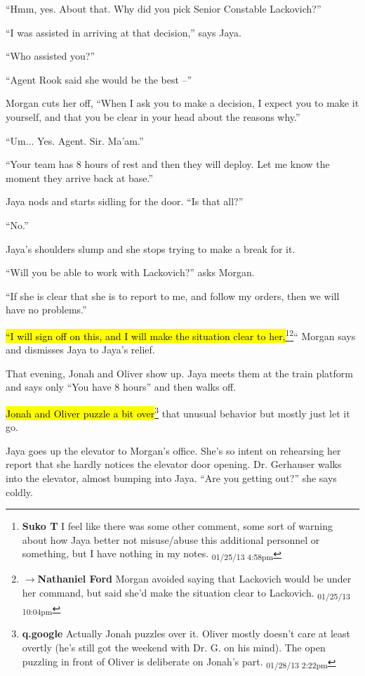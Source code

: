 ``Hmm, yes.  About that.  Why did you pick Senior Constable Lackovich?''

``I was assisted in arriving at that decision,'' says Jaya.

``Who assisted you?''

``Agent Rook said she would be the best --''

Morgan cuts her off, ``When I ask you to make a decision, I expect you to make it yourself, and that you be clear in your head about the reasons why.''

``Um... Yes.  Agent.  Sir.  Ma'am.''

``Your team has 8 hours of rest and then they will deploy.  Let me know the moment they arrive back at base.''

Jaya nods and starts sidling for the door.  ``Is that all?''

``No.''

Jaya's shoulders slump and she stops trying to make a break for it.

``Will you be able to work with Lackovich?'' asks Morgan.

``If she is clear that she is to report to me, and follow my orders, then we will have no problems.''

\hl{``I will sign off on this, and I will make the situation clear to her,}\footnote{\textbf{Suko T }I feel like there was some other comment, some sort of warning about how Jaya better not misuse/abuse this additional personnel or something, but I have nothing in my notes. \textsubscript{01/25/13 4:58pm}}\footnote{$\rightarrow$\textbf{Nathaniel Ford }Morgan avoided saying that Lackovich would be under her command, but said she'd make the situation clear to Lackovich. \textsubscript{01/25/13 10:04pm}}``  Morgan says and dismisses Jaya to Jaya's relief.



That evening, Jonah and Oliver show up.  Jaya meets them at the train platform and says only ``You have 8 hours'' and then walks off.



\hl{Jonah and Oliver puzzle a bit over}\footnote{\textbf{q.google }Actually Jonah puzzles over it.  Oliver mostly doesn't care at least overtly (he's still got the weekend with Dr. G. on his mind).  The open puzzling in front of Oliver is deliberate on Jonah's part. \textsubscript{01/28/13 2:22pm}} that unusual behavior but mostly just let it go.



Jaya goes up the elevator to Morgan's office.  She's so intent on rehearsing her report that she hardly notices the elevator door opening.  Dr. Gerhauser walks into the elevator, almost bumping into Jaya.  ``Are you getting out?'' she says coldly.



